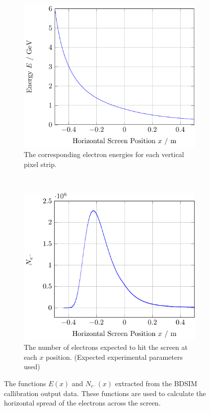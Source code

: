 \begin{figure}[!tb]
	\centering
	\begin{subfigure}[t]{\columnwidth}
		\includegraphics{./figures/eofx.pdf}
		\caption{
			The corresponding electron energies for each vertical pixel strip.
		}
		\label{fig:eofx}
	\end{subfigure}\hfill~
	\begin{subfigure}[t]{\columnwidth}
		\includegraphics{./figures/edist.pdf}
		\caption{
			The number of electrons expected to hit the screen at each \(x\)
			position. (Expected experimental parameters used)
		}
		\label{fig:edist}
	\end{subfigure}
	\caption{
		The functions \(E(x)\) and \(N_{e^-}(x)\) extracted from the BDSIM
		callibration output data. These functions are used to calculate the
		horizontal spread of the electrons across the screen.
	}
\end{figure}

